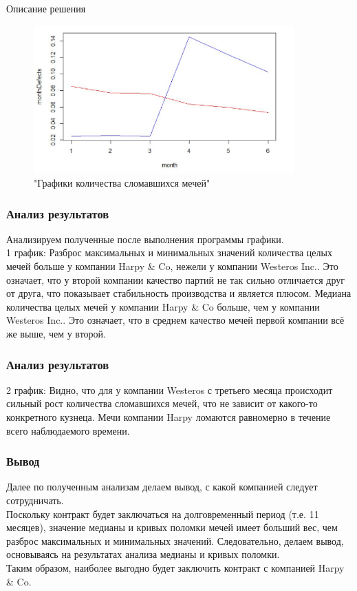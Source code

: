 \documentclass[9pt]{beamer}
\begin{document}
\begin{frame}{Описание решения}	
	\begin{figure}[h]
		\includegraphics[width=100mm]{second.jpg}
		\caption{"Графики количества сломавшихся мечей"}
		\label{second}
	\end{figure}
\end{frame}

\begin{frame}
\frametitle{Анализ результатов}
Анализируем полученные после выполнения программы графики.\\
1 график: Разброс максимальных и минимальных значений количества целых мечей больше у компании Harpy \& Co, нежели у компании Westeros Inc.. Это означает, что у второй компании качество партий не так сильно отличается друг от друга, что показывает стабильность производства и является плюсом. Медиана количества целых мечей у компании Harpy \& Co больше, чем у компании  Westeros Inc.. Это означает, что в среднем качество мечей первой компании всё же выше, чем у второй.\\
\end{frame}

\begin{frame}
\frametitle{Анализ результатов}
2 график: Видно, что для у компании Westeros с третьего месяца происходит сильный рост количества сломавшихся мечей, что не зависит от какого-то конкретного кузнеца. Мечи компании Harpy ломаются равномерно в течение всего наблюдаемого времени.
\end{frame}

\begin{frame}
\frametitle{Вывод}
Далее по полученным анализам делаем вывод, с какой компанией следует сотрудничать.\\
Поскольку контракт будет заключаться на долговременный период (т.е. 11 месяцев), значение медианы и кривых поломки мечей имеет больший вес, чем разброс максимальных и минимальных значений. Следовательно, делаем вывод, основываясь на результатах анализа медианы и кривых поломки.\\
Таким образом, наиболее выгодно будет заключить контракт с компанией Harpy \& Co.
\end{frame}
\end{document}
